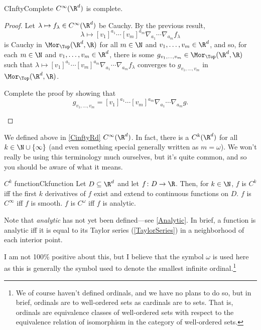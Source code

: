 \begin{thm}{}{CInftyComplete}
$C^{\infty}(\R ^d)$ is complete.
\begin{proof}
Let $\lambda \mapsto f_\lambda \in C^{\infty}(\R ^d)$ be Cauchy.  By the previous result,
\begin{equation}
\lambda \mapsto [v_1]^{a_1}\cdots [v_m]^{a_m}\nabla _{a_1}\cdots \nabla _{a_m}f_\lambda
\end{equation}
is Cauchy in $\Mor _{\Top}(\R ^d,\R )$ for all $m\in \N$ and $v_1,\ldots ,v_m\in \R ^d$, and so, for each $m\in \N$ and $v_1,\ldots ,v_m\in \R ^d$, there is some $g_{v_1,\ldots ,v_m}\in \Mor _{\Top}(\R ^d,\R )$ such that $\lambda \mapsto [v_1]^{a_1}\cdots [v_m]^{a_m}\nabla _{a_1}\cdots \nabla _{a_m}f_\lambda$ converges to $g_{v_1,\ldots ,v_m}$ in $\Mor _{\Top}(\R ^d,\R )$.
\begin{exr}[breakable=false]{}{}
Complete the proof by showing that
\begin{equation}
g_{v_1,\ldots ,v_m}=[v_1]^{a_1}\cdots [v_m]^{a_m}\nabla _{a_1}\cdots \nabla _{a_m}g.
\end{equation}
\end{exr}
\end{proof}
\end{thm}

We defined above in \cref{CinftyRd} $C^{\infty}(\R ^d)$.  In fact, there is a $C^k(\R ^d)$ for all $k\in \N \cup \{ \infty \}$ (and even something special generally written as $m=\omega$).  We won't really be using this terminology much ourselves, but it's quite common, and so you should be aware of what it means.
\begin{dfn}{$C^k$ function}{Ckfunction}
Let $D\subseteq \R ^d$ and let $f\colon D\rightarrow \R$.  Then, for $k\in \N$, $f$ is \emph{$C^k$} iff the first $k$ derivatives of $f$ exist and extend to continuous functions on $D$.  $f$ is \emph{$C^{\infty}$} iff $f$ is smooth.  $f$ is \emph{$C^{\omega}$} iff $f$ is analytic.
\begin{rmk}
Note that \emph{analytic} has not yet been defined---see \cref{Analytic}.  In brief, a function is analytic iff it is equal to its Taylor series (\cref{TaylorSeries}) in a neighborhood of each interior point.
\end{rmk}
\begin{rmk}
I am not 100\% positive about this, but I believe that the symbol $\omega$ is used here as this is generally the symbol used to denote the smallest infinite ordinal.\footnote{We of course haven't defined ordinals, and we have no plans to do so, but in brief, ordinals are to well-ordered sets as cardinals are to sets.  That is, ordinals are equivalence classes of well-ordered sets with respect to the equivalence relation of isomorphism in the category of well-ordered sets.}
\end{rmk}
\end{dfn}

